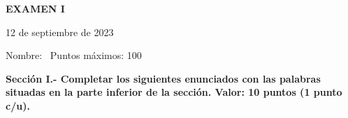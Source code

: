 \documentclass[10pt,addpoints]{exam}
\begin{document}
\begin{center}
  \sffamily\textbf{EXAMEN I}
\end{center}
\begin{flushright}
12 de septiembre de 2023
\end{flushright}
Nombre:~\makebox[4in]{\hrulefill}
Puntos máximos: 100

\begin{questions}

\begin{EnvFullwidth}
  \sffamily\textbf{Sección I.- Completar los siguientes enunciados con las
  palabras situadas en la parte inferior de la sección. Valor: 10 puntos
  (1 punto c/u).}
\end{EnvFullwidth}












\end{questions}
\end{document}

